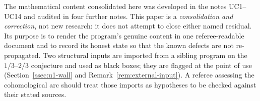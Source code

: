 The mathematical content consolidated here was developed in the notes
UC1--UC14 and audited in four further notes. This paper is a
\emph{consolidation and correction}, not new research: it does not
attempt to close either named residual. Its purpose is to render the
program's genuine content in one referee-readable document and to
record its honest state so that the known defects are not
re-propagated. Two structural inputs are imported from a sibling
program on the $1/3$--$2/3$ conjecture and used as black boxes; they
are flagged at the point of use (Section~\ref{ssec:u1-wall} and
Remark~\ref{rem:external-input}). A referee assessing the cohomological
arc should treat those imports as hypotheses to be checked against
their stated sources.
